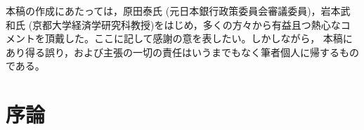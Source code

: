 \documentclass[12pt]{jarticle}
\begin{document}
{\vspace{80pt}

本稿の作成にあたっては，原田泰氏 (元日本銀行政策委員会審議委員)，岩本武和氏 (京都大学経済学研究科教授)をはじめ，多くの方々から有益且つ熱心なコメントを頂戴した。ここに記して感謝の意を表したい。しかしながら， 本稿にあり得る誤り，および主張の一切の責任はいうまでもなく筆者個人に帰するものである。

\newpage
\thispagestyle{empty}
{\large \tableofcontents}%
\newpage
{}%

\section{序論}






}
\end{document}
